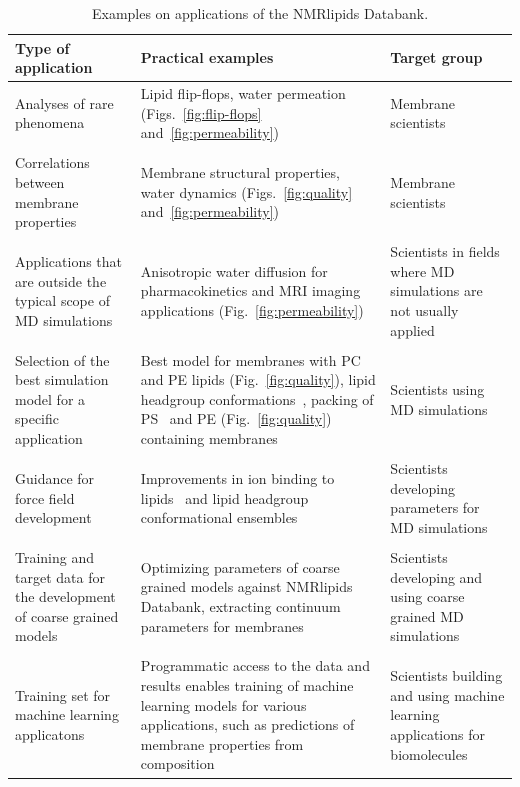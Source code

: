 \documentclass[fleqn,10pt]{wlscirep}
\begin{document}
\begin{table}[t]
    \centering
    \begin{tabular}{p{5.0cm}  p{5.0cm}  p{4.0cm}}
    Type of application     & Practical examples & Target group \\
    \hline
    Analyses of rare phenomena               & Lipid flip-flops, water permeation (Figs.~\ref{fig:flip-flops} and~\ref{fig:permeability}) & Membrane scientists \\
    \\
    Correlations between membrane properties & 
    Membrane structural properties, water dynamics (Figs.~\ref{fig:quality} and~\ref{fig:permeability}) & 
    Membrane scientists \\
    \\
    Applications that are outside the typical scope of MD simulations & 
    Anisotropic water diffusion for pharmacokinetics and MRI imaging applications (Fig.~\ref{fig:permeability}) & 
    Scientists in fields where MD simulations are not usually applied \\
    \\
    Selection of the best simulation model for a specific application & 
    Best model for membranes with PC and PE lipids (Fig.~\ref{fig:quality}), lipid headgroup conformations~\cite{bacle21}, 
    packing of PS~\cite{antila22b} and PE (Fig.~\ref{fig:quality}) containing membranes &
    Scientists using MD simulations \\
    \\
    Guidance for force field development & 
    Improvements in ion binding to lipids~\cite{melcr18,melcr20} and lipid headgroup conformational ensembles~\cite{yu21,dickson22,grote20} &
    Scientists developing parameters for MD simulations \\
    \\
    Training and target data for the development of coarse grained models & 
    Optimizing parameters of coarse grained models against NMRlipids Databank, extracting continuum parameters for membranes &
    Scientists developing and using coarse grained MD simulations \\
    \\
    Training set for machine learning applicatons &
    Programmatic access to the data and results enables training of machine learning models for various applications, such as predictions of membrane properties from composition & Scientists building and using machine learning applications for biomolecules
    \end{tabular}
    \caption{Examples on applications of the NMRlipids Databank.}
    \label{tab:applications}
\end{table}
\end{document}
